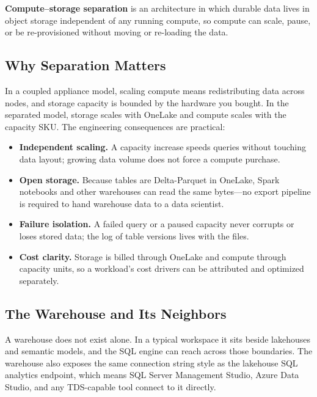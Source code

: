\begin{definitionbox}
\textbf{Compute--storage separation} is an architecture in which durable data lives in object storage independent of any running compute, so compute can scale, pause, or be re-provisioned without moving or re-loading the data.
\end{definitionbox}

\subsection{Why Separation Matters}
In a coupled appliance model, scaling compute means redistributing data across nodes, and storage capacity is bounded by the hardware you bought. In the separated model, storage scales with OneLake and compute scales with the capacity SKU. The engineering consequences are practical:

\begin{itemize}
    \item \textbf{Independent scaling.} A capacity increase speeds queries without touching data layout; growing data volume does not force a compute purchase.
    \item \textbf{Open storage.} Because tables are Delta-Parquet in OneLake, Spark notebooks and other warehouses can read the same bytes---no export pipeline is required to hand warehouse data to a data scientist.
    \item \textbf{Failure isolation.} A failed query or a paused capacity never corrupts or loses stored data; the log of table versions lives with the files.
    \item \textbf{Cost clarity.} Storage is billed through OneLake and compute through capacity units, so a workload's cost drivers can be attributed and optimized separately.
\end{itemize}

\subsection{The Warehouse and Its Neighbors}
A warehouse does not exist alone. In a typical workspace it sits beside lakehouses and semantic models, and the SQL engine can reach across those boundaries. The warehouse also exposes the same connection string style as the lakehouse SQL analytics endpoint, which means SQL Server Management Studio, Azure Data Studio, and any TDS-capable tool connect to it directly.

